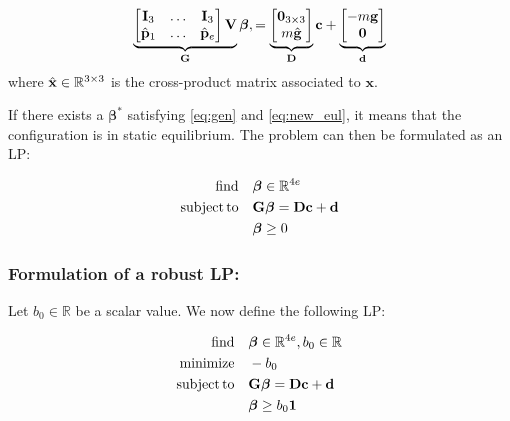 \begin{align} \label{eq:new_eul}
\underbrace{
\mat{\mathbf{I}_3 & \dots & \mathbf{I}_3 \\
\hat{\mathbf{p}}_1 & \dots & \hat{\mathbf{p}}_e} \mathbf{V}
}_\mathbf{G} \bm{\beta}, = 
\underbrace{\mat{\mathbf{0}_{3\times 3} \\ m \hat{\mathbf{g}}}}_{\mathbf{D}} \mathbf{c} + 
\underbrace{\mat{-m\mathbf{g} \\ \mathbf{0}}}_{\mathbf{d}}
\end{align}
where $\hat{\mathbf{x}} \in \mathbb{R}^{3\times 3}$ is the cross-product matrix associated to $\mathbf{x}$.

If there exists a $\bm{\beta}^*$ satisfying \eqref{eq:gen} and \eqref{eq:new_eul}, it means that the configuration is in static equilibrium.
The problem can then be formulated as an LP:

\begin{equation} \label{eq:lin_prog} \begin{aligned}
\find \quad & \bm{\beta} \in \Rv{4e} \\
\st \quad &\mathbf{G} \bm{\beta} = \mathbf{D} \mathbf{c} + \mathbf{d} \\
& \bm{\beta} \ge 0 \\
\end{aligned} \end{equation}

\subsubsection{Formulation of a robust LP:}
Let $b_0 \in \mathbb{R}$ be a scalar value. We now define the following LP:

\begin{equation} \label{eq:lin_prog_rob} \begin{aligned}
\find \quad & \bm{\beta} \in \Rv{4e}, b_0 \in \Rv{} \\
\minimize  \quad & -b_0 \\
\st \quad &\mathbf{G} \bm{\beta} = \mathbf{D} \mathbf{c} + \mathbf{d} \\
& \bm{\beta} \ge b_0 \bm{1}\\
\end{aligned} \end{equation}


